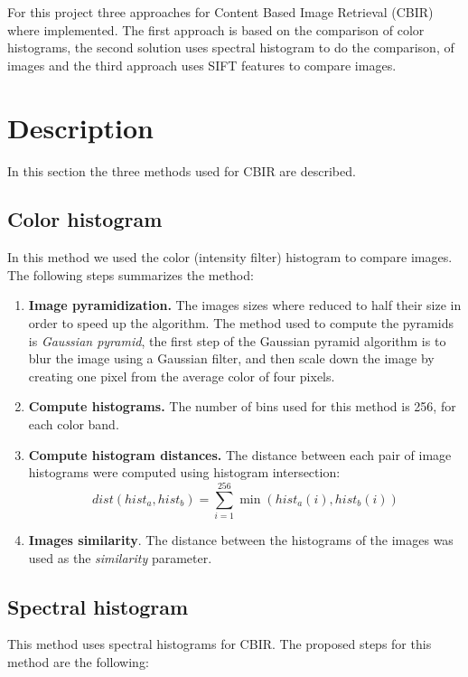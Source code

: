 \documentclass[a4paper,12pt]{article}
\begin{document}
For this project three approaches for Content Based Image Retrieval  (CBIR)
where implemented. The first approach is based on the comparison of color 
histograms, the second solution uses spectral histogram to do the comparison,
of images and the third approach uses SIFT features to compare images. 

\section{Description}
In this section the three methods used for CBIR are described. 

\subsection{Color histogram}
\label{sec_colorhist}
In this method we used the color (intensity filter) histogram  to 
compare images. The following steps summarizes the method:
\begin{enumerate}
    \item \textbf{Image pyramidization. } The images sizes where reduced
        to half their size in order to speed up the algorithm. The method used
        to compute the pyramids is \emph{Gaussian pyramid}, the first
        step of the Gaussian pyramid algorithm is to blur the image 
        using a Gaussian filter, and then scale down the image by 
        creating one pixel from the average color of four pixels.
    \item \textbf{Compute histograms.} The number of bins used
        for this method is 256, for each color band.
    \item \textbf{Compute histogram distances.} The distance between
        each pair of image histograms were computed using histogram intersection:
        \begin{equation}
            dist(hist_a,hist_b) = \sum_{i=1}^{256} \min( hist_a(i), hist_b(i))
        \end{equation}
    \item \textbf{Images similarity}. The distance between the histograms
        of the images was used as the \emph{similarity} parameter. 
\end{enumerate}

\subsection{Spectral histogram}
\label{sec_spechist}
This method uses spectral histograms for CBIR. The proposed steps
for this method are the following:
\end{document}
